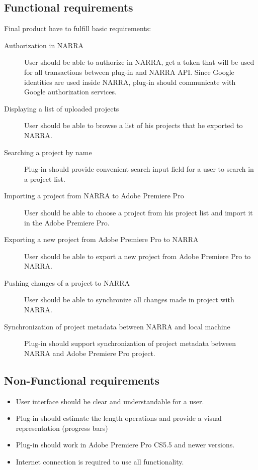 \documentclass[thesis=B,english]{FITthesis}[2012/10/20]
\begin{document}
\subsection{Functional requirements}
Final product have to fulfill basic requirements:
	\begin{description}
		\item [Authorization in NARRA] 
User should be able to authorize in NARRA, get a token that will be used for all transactions between plug-in and NARRA API. Since Google identities are used inside NARRA, plug-in should communicate with Google authorization services.
		\item [Displaying a list of uploaded projects]
User should be able to browse a list of his projects that he exported to NARRA.
		\item [Searching a project by name]
Plug-in should provide convenient search input field for a user to search in a project list.
		\item [Importing a project from NARRA to Adobe Premiere Pro]
User should be able to choose a project from his project list and import it in the Adobe Premiere Pro.
		\item [Exporting a new project from Adobe Premiere Pro to NARRA]
User should be able to export a new project from Adobe Premiere Pro to NARRA.
		\item [Pushing changes of a project to NARRA]
User should be able to synchronize all changes made in project with NARRA.
		\item [Synchronization of project metadata between NARRA and local machine]
Plug-in should support synchronization of project metadata between NARRA and Adobe Premiere Pro project.
	\end{description}
\subsection{Non-Functional requirements}
	\begin{itemize}
		\item User interface should be clear and understandable for a user.
		\item Plug-in should estimate the length operations and provide a visual representation (progress bars)
		\item Plug-in should work in Adobe Premiere Pro CS5.5 and newer versions.
		\item Internet connection is required to use all functionality.
	\end{itemize}
\end{document}
